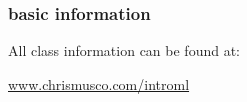 \documentclass[handout,compress]{beamer}
\begin{document}
%
%		
%

\begin{frame}
	\frametitle{basic information}
	All class information can be found at:
	\begin{center}
		\large \url{www.chrismusco.com/introml}
	\end{center}
\end{frame}
\end{document}
